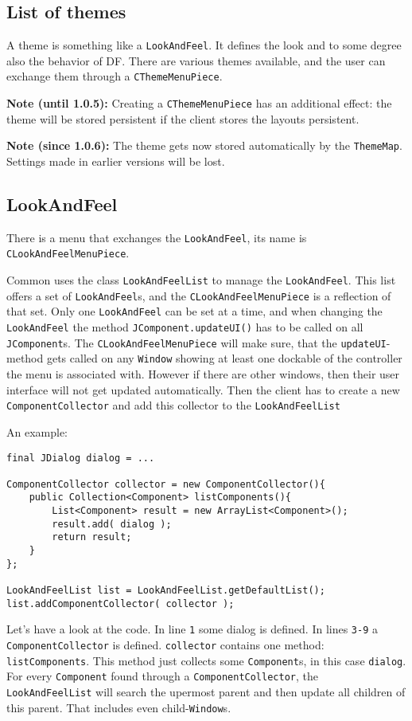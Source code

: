 \documentclass[a4paper,10pt]{article}
\newcommand{\src}[1]{\lstinline[basicstyle=\ttfamily]|#1|}
\newcommand{\until}[1]{\textbf{Note (until #1): }}
\newcommand{\since}[1]{\textbf{Note (since #1): }}
\begin{document}
\subsection{List of themes}
A theme is something like a \src{LookAndFeel}. It defines the look and to some degree also the behavior of DF. There are various themes available, and the user can exchange them through a \src{CThemeMenuPiece}.

\until{1.0.5} Creating a \src{CThemeMenuPiece} has an additional effect: the theme will be stored persistent if the client stores the layouts persistent.

\since{1.0.6} The theme gets now stored automatically by the \src{ThemeMap}. Settings made in earlier versions will be lost.

\subsection{LookAndFeel}
There is a menu that exchanges the \src{LookAndFeel}, its name is \\\src{CLookAndFeelMenuPiece}.

Common uses the class \src{LookAndFeelList} to manage the \src{LookAndFeel}. This list offers a set of \src{LookAndFeel}s, and the \src{CLookAndFeelMenuPiece} is a reflection of that set. Only one \src{LookAndFeel} can be set at a time, and when changing the \src{LookAndFeel} the method \src{JComponent.updateUI()} has to be called on all \src{JComponent}s. The \src{CLookAndFeelMenuPiece} will make sure, that the \src{updateUI}-method gets called on any \src{Window} showing at least one dockable of the controller the menu is associated with. However if there are other windows, then their user interface will not get updated automatically. Then the client has to create a new \src{ComponentCollector} and add this collector to the \src{LookAndFeelList}

An example:
\begin{lstlisting}
final JDialog dialog = ...

ComponentCollector collector = new ComponentCollector(){
	public Collection<Component> listComponents(){
		List<Component> result = new ArrayList<Component>();
		result.add( dialog );
		return result;
	}
};

LookAndFeelList list = LookAndFeelList.getDefaultList();
list.addComponentCollector( collector );
\end{lstlisting}
Let's have a look at the code. In line \src{1} some dialog is defined. In lines \src{3-9} a \src{ComponentCollector} is defined. \src{collector} contains one method: \\\src{listComponents}. This method just collects some \src{Component}s, in this case \src{dialog}. For every \src{Component} found through a \src{ComponentCollector}, the \\\src{LookAndFeelList} will search the upermost parent and then update all children of this parent. That includes even child-\src{Window}s.
\end{document}
